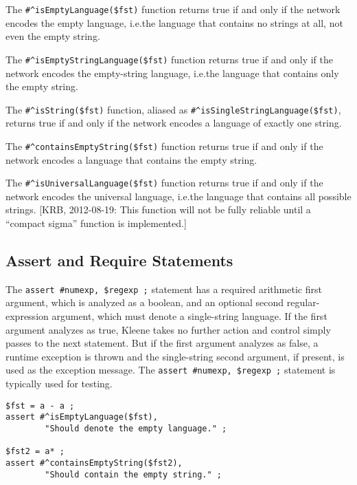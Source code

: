 The \verb!#^isEmptyLanguage($fst)! function returns true if and only if the network encodes the empty
language, i.e.\@ the language that contains no strings at all, not even the empty string.

The \verb!#^isEmptyStringLanguage($fst)! function returns true if and only if the network encodes the
empty-string language, i.e.\@ the language that contains only the empty string.

The \verb!#^isString($fst)! function, aliased as \verb!#^isSingleStringLanguage($fst)!, returns true if
and only if the network encodes a language of exactly one string.

The \verb!#^containsEmptyString($fst)! function returns true if and only if the network encodes a
language that contains the empty string.

The \verb!#^isUniversalLanguage($fst)! function returns true if and only if the network encodes the
universal language, i.e.\@ the language that contains all possible strings.  [KRB, 2012-08-19:  This
function will not be fully reliable until a ``compact sigma'' function is implemented.]

\subsection{Assert and Require Statements}

The \verb!assert #numexp, $regexp ;! statement has a required arithmetic first
argument, which is analyzed as a boolean, and an optional second
regular-expression argument, which must denote a single-string language.  If
the first argument analyzes as true, Kleene takes no further action and control simply passes to the next
statement.  But if the first argument analyzes as false, a runtime exception is thrown and
the single-string second argument, if present, is used as the exception
message.  The \verb!assert #numexp, $regexp ;! statement is typically used
for testing.

\begin{Verbatim}[fontsize=\small]
$fst = a - a ;
assert #^isEmptyLanguage($fst), 
        "Should denote the empty language." ;

$fst2 = a* ;
assert #^containsEmptyString($fst2), 
        "Should contain the empty string." ;
\end{Verbatim}

